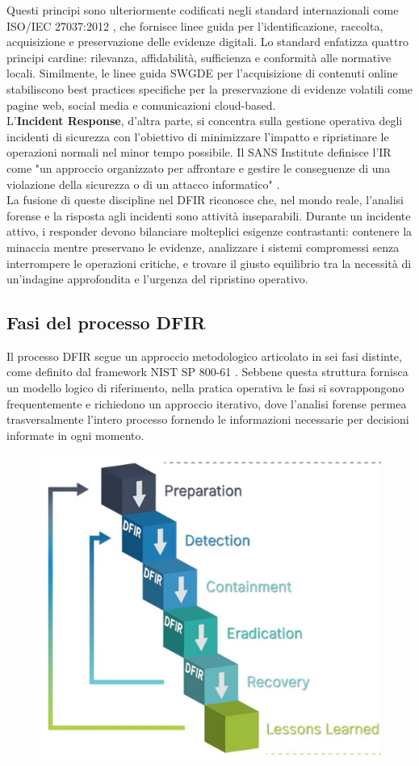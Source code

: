 Questi principi sono ulteriormente codificati negli standard internazionali come ISO/IEC 27037:2012 \cite{iso27037}, che fornisce linee guida per l'identificazione, raccolta, acquisizione e preservazione delle evidenze digitali. Lo standard enfatizza quattro principi cardine: rilevanza, affidabilità, sufficienza e conformità alle normative locali. Similmente, le linee guida SWGDE \cite{swgde2022} per l'acquisizione di contenuti online stabiliscono best practices specifiche per la preservazione di evidenze volatili come pagine web, social media e comunicazioni cloud-based.\\

L'\textbf{Incident Response}, d'altra parte, si concentra sulla gestione operativa degli incidenti di sicurezza con l'obiettivo di minimizzare l'impatto e ripristinare le operazioni normali nel minor tempo possibile. Il SANS Institute definisce l'IR come "un approccio organizzato per affrontare e gestire le conseguenze di una violazione della sicurezza o di un attacco informatico" \cite{sans2023}.\\

La fusione di queste discipline nel DFIR riconosce che, nel mondo reale, l'analisi forense e la risposta agli incidenti sono attività inseparabili. Durante un incidente attivo, i responder devono bilanciare molteplici esigenze contrastanti: contenere la minaccia mentre preservano le evidenze, analizzare i sistemi compromessi senza interrompere le operazioni critiche, e trovare il giusto equilibrio tra la necessità di un'indagine approfondita e l'urgenza del ripristino operativo.

\subsection{Fasi del processo DFIR}

Il processo DFIR segue un approccio metodologico articolato in sei fasi distinte, come definito dal framework NIST SP 800-61 \cite{cichonski2012}. Sebbene questa struttura fornisca un modello logico di riferimento, nella pratica operativa le fasi si sovrappongono frequentemente e richiedono un approccio iterativo, dove l'analisi forense permea trasversalmente l'intero processo fornendo le informazioni necessarie per decisioni informate in ogni momento.

\begin{figure}[ht]
    \centering
    \includegraphics[width=0.6\linewidth]{images/stato-arte/digital-forensics-incident-response-plan-flow.png}
\end{figure}

